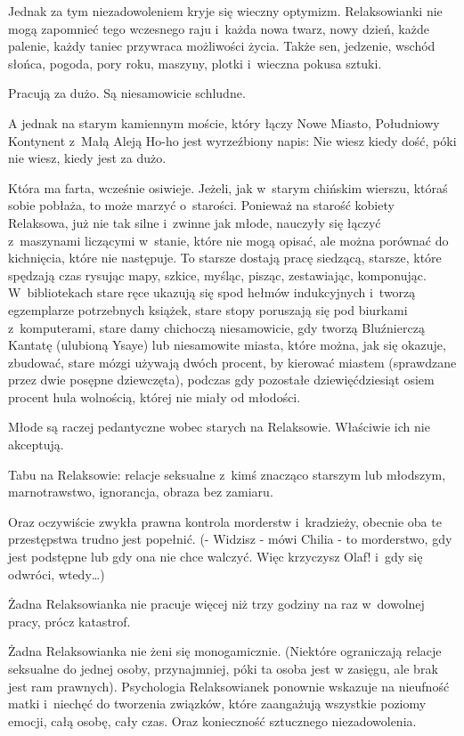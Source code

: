 \documentclass[oneside,polish,12pt,sfheadings]{mwbk}
\begin{document}
Jednak za tym niezadowoleniem kryje się wieczny optymizm. Relaksowianki
nie mogą zapomnieć tego wczesnego raju i~każda nowa twarz, nowy dzień,
każde palenie, każdy taniec przywraca możliwości życia. Także sen,
jedzenie, wschód słońca, pogoda, pory roku, maszyny, plotki i~wieczna
pokusa sztuki.

Pracują za dużo. Są niesamowicie schludne.

A jednak na starym kamiennym moście, który łączy Nowe Miasto, Południowy
Kontynent z~Małą Aleją Ho-ho jest wyrzeźbiony napis: Nie wiesz kiedy
dość, póki nie wiesz, kiedy jest za dużo.

Która ma farta, wcześnie osiwieje. Jeżeli, jak w~starym chińskim wierszu,
któraś sobie pobłaża, to może marzyć o~starości. Ponieważ na starość
kobiety Relaksowa, już nie tak silne i~zwinne jak młode, nauczyły
się łączyć z~maszynami liczącymi w~stanie, które nie mogą opisać,
ale można porównać do kichnięcia, które nie następuje. To starsze dostają
pracę siedzącą, starsze, które spędzają czas rysując mapy, szkice,
myśląc, pisząc, zestawiając, komponując. W~bibliotekach stare ręce
ukazują się spod hełmów indukcyjnych i~tworzą egzemplarze potrzebnych
książek, stare stopy poruszają się pod biurkami z~komputerami, stare
damy chichoczą niesamowicie, gdy tworzą Bluźnierczą Kantatę (ulubioną
Ysaye) lub niesamowite miasta, które można, jak się okazuje, zbudować,
stare mózgi używają dwóch procent, by kierować miastem (sprawdzane
przez dwie posępne dziewczęta), podczas gdy pozostałe dziewięćdziesiąt
osiem procent hula wolnością, której nie miały od młodości.

Młode są raczej pedantyczne wobec starych na Relaksowie. Właściwie
ich nie akceptują.

Tabu na Relaksowie: relacje seksualne z~kimś znacząco starszym lub
młodszym, marnotrawstwo, ignorancja, obraza bez zamiaru.

Oraz oczywiście zwykła prawna kontrola morderstw i~kradzieży, obecnie
oba te przestępstwa trudno jest popełnić. (- Widzisz - mówi Chilia
- to morderstwo, gdy jest podstępne lub gdy ona nie chce walczyć.
Więc krzyczysz Olaf! i~gdy się odwróci, wtedy\ldots)

Żadna Relaksowianka nie pracuje więcej niż trzy godziny na raz w~dowolnej
pracy, prócz katastrof.

Żadna Relaksowianka nie żeni się monogamicznie. (Niektóre ograniczają
relacje seksualne do jednej osoby, przynajmniej, póki ta osoba jest
w zasięgu, ale brak jest ram prawnych). Psychologia Relaksowianek
ponownie wskazuje na nieufność matki i~niechęć do tworzenia związków,
które zaangażują wszystkie poziomy emocji, całą osobę, cały czas.
Oraz konieczność sztucznego niezadowolenia.
\end{document}
